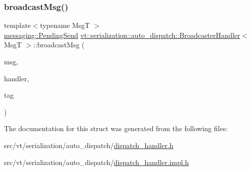 \subsubsection{\texorpdfstring{broadcast\+Msg()}{broadcastMsg()}}
{\footnotesize\ttfamily template$<$typename MsgT $>$ \\
\hyperlink{structvt_1_1messaging_1_1_pending_send}{messaging\+::\+Pending\+Send} \hyperlink{structvt_1_1serialization_1_1auto__dispatch_1_1_broadcaster_handler}{vt\+::serialization\+::auto\+\_\+dispatch\+::\+Broadcaster\+Handler}$<$ MsgT $>$\+::broadcast\+Msg (\begin{DoxyParamCaption}\item[{MsgT $\ast$}]{msg,  }\item[{\hyperlink{namespacevt_af64846b57dfcaf104da3ef6967917573}{Handler\+Type} const \&}]{handler,  }\item[{\hyperlink{namespacevt_a84ab281dae04a52a4b243d6bf62d0e52}{Tag\+Type} const \&}]{tag }\end{DoxyParamCaption})\hspace{0.3cm}{\ttfamily [static]}}



The documentation for this struct was generated from the following files\+:\begin{DoxyCompactItemize}
\item 
src/vt/serialization/auto\+\_\+dispatch/\hyperlink{dispatch__handler_8h}{dispatch\+\_\+handler.\+h}\item 
src/vt/serialization/auto\+\_\+dispatch/\hyperlink{dispatch__handler_8impl_8h}{dispatch\+\_\+handler.\+impl.\+h}\end{DoxyCompactItemize}
